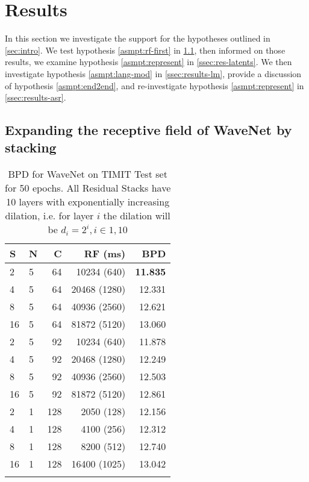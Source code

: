 \section{Results}

In this section we investigate the support for the hypotheses outlined in \cref{sec:intro}. 
We test hypothesis \ref{asmpt:rf-first} in \cref{ssec:results-stacking}, then informed on those results, we examine hypothesis \ref{asmpt:represent} in \cref{ssec:res-latents}.
We then investigate hypothesis \ref{asmpt:lang-mod} in \cref{ssec:results-lm}, provide a discussion of hypothesis \ref{asmpt:end2end}, and re-investigate hypothesis \ref{asmpt:represent} in \cref{ssec:results-asr}.

\subsection{Expanding the receptive field of WaveNet by stacking}\label{ssec:results-stacking}
\begin{table}[t]
    \centering
    \begin{tabular}{l l r | r ||r}
    
    S & N & C & RF (ms) & BPD \\ \hline
    2 & 5 & 64 & 10234 (640)  & \textbf{11.835}        \\  %
    4 & 5 & 64 &  20468 (1280) & 12.331                \\  %
    8 & 5 & 64 &  40936 (2560) & 12.621                \\  %
    16 & 5 & 64 & 81872 (5120) & 13.060                \\  %
    \hline
    2 & 5 & 92 &  10234 (640)  &  11.878    \\ 
    4 & 5 & 92 &  20468 (1280) &  12.249    \\ 
    8 & 5 & 92 &  40936 (2560) &  12.503    \\ 
    16 & 5 & 92 & 81872 (5120) & 12.861     \\ 
    \hline
    2 & 1 & 128 & 2050 (128) & 12.156     \\ 
    4 & 1 & 128 & 4100 (256) & 12.312     \\ 
    8 & 1 & 128 & 8200 (512) & 12.740     \\ 
    16 & 1 & 128 & 16400 (1025) & 13.042    \\ 
    \hspace{0.5cm}
    \end{tabular}
    \caption{BPD for WaveNet on TIMIT Test set for 50 epochs. 
    All Residual Stacks have 10 layers with exponentially increasing dilation, i.e. for layer $i$ the dilation will be $d_i = 2^{i}, i \in {1, 10}$
    }
    \label{tab:stack-bpds}
\end{table}

